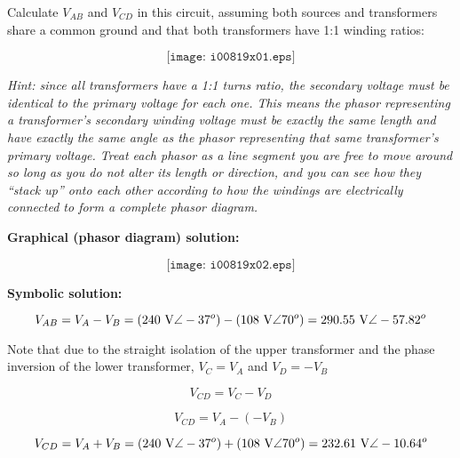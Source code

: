 

Calculate $V_{AB}$ and $V_{CD}$ in this circuit, assuming both sources and transformers share a common ground and that both transformers have 1:1 winding ratios:

$$\texttt{[image: i00819x01.eps]}$$

{\it Hint: since all transformers have a 1:1 turns ratio, the secondary voltage must be identical to the primary voltage for each one.  This means the phasor representing a transformer's secondary winding voltage must be exactly the same length and have exactly the same angle as the phasor representing that same transformer's primary voltage.  Treat each phasor as a line segment you are free to move around so long as you do not alter its length or direction, and you can see how they ``stack up'' onto each other according to how the windings are electrically connected to form a complete phasor diagram.}







\noindent
{\bf Graphical (phasor diagram) solution:}

$$\texttt{[image: i00819x02.eps]}$$







\noindent
{\bf Symbolic solution:}

$$V_{AB} = V_A - V_B = (240 \hbox{ V} \angle -37^o) - (108 \hbox{ V} \angle 70^o) = 290.55 \hbox{ V} \angle -57.82^o$$

Note that due to the straight isolation of the upper transformer and the phase inversion of the lower transformer, $V_C = V_A$ and $V_D = - V_B$

$$V_{CD} = V_C - V_D$$

$$V_{CD} = V_A - (-V_B)$$

$$V_{CD} = V_A + V_B = (240 \hbox{ V} \angle -37^o) + (108 \hbox{ V} \angle 70^o) = 232.61 \hbox{ V} \angle -10.64^o $$









